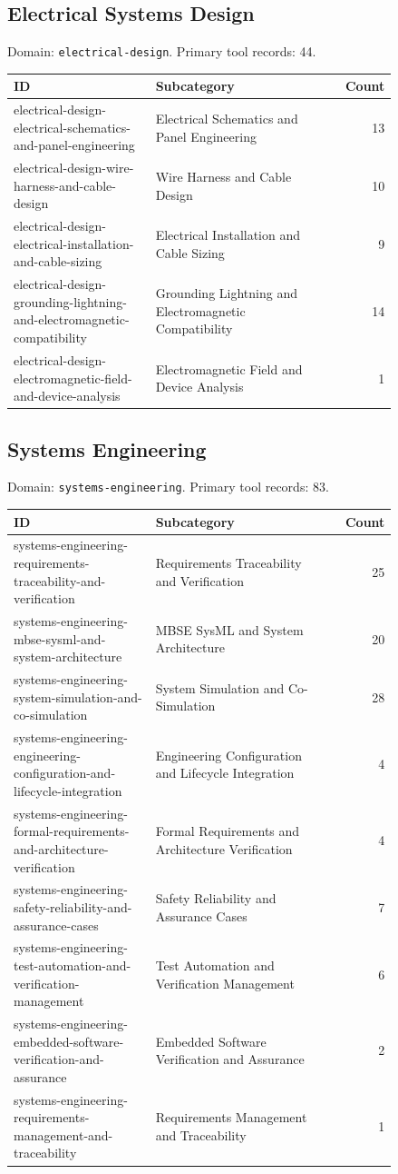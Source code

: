 \subsection{Electrical Systems Design}
\noindent Domain: \texttt{electrical-design}. Primary tool records: 44.
\begin{longtable}{p{0.37\linewidth}p{0.47\linewidth}r}
ID & Subcategory & Count\\\hline\endhead
electrical-design-electrical-schematics-and-panel-engineering & Electrical Schematics and Panel Engineering & 13\\
electrical-design-wire-harness-and-cable-design & Wire Harness and Cable Design & 10\\
electrical-design-electrical-installation-and-cable-sizing & Electrical Installation and Cable Sizing & 9\\
electrical-design-grounding-lightning-and-electromagnetic-compatibility & Grounding Lightning and Electromagnetic Compatibility & 14\\
electrical-design-electromagnetic-field-and-device-analysis & Electromagnetic Field and Device Analysis & 1\\
\end{longtable}
\subsection{Systems Engineering}
\noindent Domain: \texttt{systems-engineering}. Primary tool records: 83.
\begin{longtable}{p{0.37\linewidth}p{0.47\linewidth}r}
ID & Subcategory & Count\\\hline\endhead
systems-engineering-requirements-traceability-and-verification & Requirements Traceability and Verification & 25\\
systems-engineering-mbse-sysml-and-system-architecture & MBSE SysML and System Architecture & 20\\
systems-engineering-system-simulation-and-co-simulation & System Simulation and Co-Simulation & 28\\
systems-engineering-engineering-configuration-and-lifecycle-integration & Engineering Configuration and Lifecycle Integration & 4\\
systems-engineering-formal-requirements-and-architecture-verification & Formal Requirements and Architecture Verification & 4\\
systems-engineering-safety-reliability-and-assurance-cases & Safety Reliability and Assurance Cases & 7\\
systems-engineering-test-automation-and-verification-management & Test Automation and Verification Management & 6\\
systems-engineering-embedded-software-verification-and-assurance & Embedded Software Verification and Assurance & 2\\
systems-engineering-requirements-management-and-traceability & Requirements Management and Traceability & 1\\
\end{longtable}
